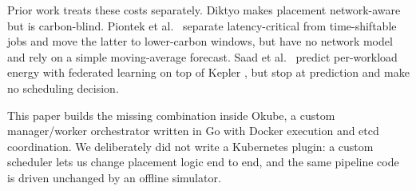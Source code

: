 \documentclass[conference]{IEEEtran}
\begin{document}
Prior work treats these costs separately. Diktyo \cite{santos2023} makes placement network-aware but is carbon-blind. Piontek et al.\ \cite{piontek2024} separate latency-critical from time-shiftable jobs and move the latter to lower-carbon windows, but have no network model and rely on a simple moving-average forecast. Saad et al.\ \cite{saad2025} predict per-workload energy with federated learning on top of Kepler \cite{amaral2023}, but stop at prediction and make no scheduling decision.

This paper builds the missing combination inside Okube, a custom manager/worker orchestrator written in Go with Docker execution and etcd coordination. We deliberately did not write a Kubernetes plugin: a custom scheduler lets us change placement logic end to end, and the same pipeline code is driven unchanged by an offline simulator.
\end{document}
